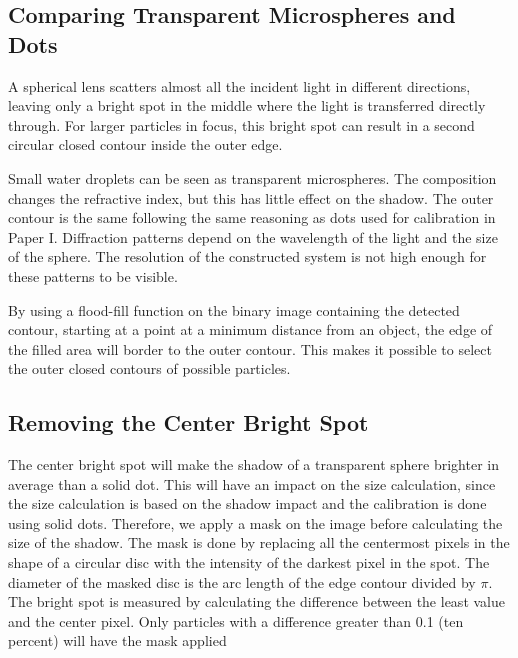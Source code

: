 \subsection{Comparing Transparent Microspheres and Dots}

A spherical lens scatters almost all the incident light in different directions, leaving only a bright spot in the middle where the light is transferred directly through. For larger particles in focus, this bright spot can result in a second circular closed contour inside the outer edge. 

Small water droplets can be seen as transparent microspheres. The composition changes the refractive index, but this has little effect on the shadow. The outer contour is the same following the same reasoning as dots used for calibration in Paper I. Diffraction patterns depend on the wavelength of the light and the size of the sphere. The resolution of the constructed system is not high enough for these patterns to be visible.

By using a flood-fill function on the binary image containing the detected contour, starting at a point at a minimum distance from an object, the edge of the filled area will border to the outer contour. This makes it possible to select the outer closed contours of possible particles.

\subsection{Removing the Center Bright Spot}

The center bright spot will make the shadow of a transparent sphere brighter in average than a solid dot. This will have an impact on the size calculation, since the size calculation is based on the shadow impact and the calibration is done using solid dots. Therefore, we apply a mask on the image before calculating the size of the shadow. The mask is done by replacing all the centermost pixels in the shape of a circular disc with the intensity of the darkest pixel in the spot. The diameter of the masked disc is the arc length of the edge contour divided by $\pi$. The bright spot is measured by calculating the difference between the least value and the center pixel. Only particles with a difference greater than 0.1 (ten percent) will have the mask applied

